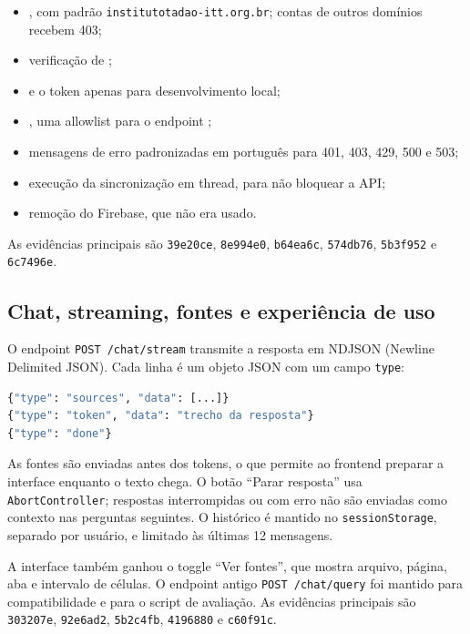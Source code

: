 \documentclass[12pt,a4paper]{article}
\newcommand{\commit}[1]{\texttt{#1}}
\begin{document}
\begin{itemize}
  \item {}, com padrão
        \texttt{institutotadao-itt.org.br}; contas de outros domínios recebem 403;
  \item verificação de ;
  \item {} e o token  apenas para
        desenvolvimento local;
  \item {}, uma allowlist para o endpoint
        ;
  \item mensagens de erro padronizadas em português para 401, 403, 429, 500 e 503;
  \item execução da sincronização em thread, para não bloquear a API;
  \item remoção do Firebase, que não era usado.
\end{itemize}

As evidências principais são \commit{39e20ce}, \commit{8e994e0},
\commit{b64ea6c}, \commit{574db76}, \commit{5b3f952} e \commit{6c7496e}.

\subsection{Chat, streaming, fontes e experiência de uso}

O endpoint \texttt{POST /chat/stream} transmite a resposta em NDJSON (Newline Delimited JSON). Cada linha é
um objeto JSON com um campo \texttt{type}:

\begin{lstlisting}[language=Python,caption={Formato simplificado dos eventos do endpoint de streaming.},label={lst:ndjson}]
{"type": "sources", "data": [...]}
{"type": "token", "data": "trecho da resposta"}
{"type": "done"}
\end{lstlisting}

As fontes são enviadas antes dos tokens, o que permite ao frontend preparar a
interface enquanto o texto chega. O botão ``Parar resposta'' usa
\texttt{AbortController}; respostas interrompidas ou com erro não são enviadas
como contexto nas perguntas seguintes. O histórico é mantido no
\texttt{sessionStorage}, separado por usuário, e limitado às últimas 12 mensagens.

A interface também ganhou o toggle ``Ver fontes'', que mostra arquivo, página, aba
e intervalo de células. O endpoint antigo \texttt{POST /chat/query} foi mantido
para compatibilidade e para o script de avaliação. As evidências principais são
\commit{303207e}, \commit{92e6ad2}, \commit{5b2c4fb}, \commit{4196880} e
\commit{c60f91c}.
\end{document}
